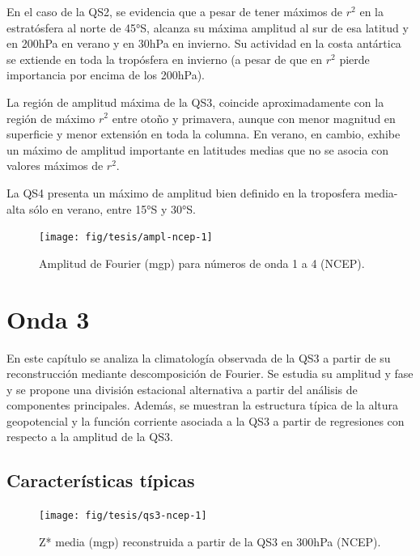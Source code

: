 \documentclass[spanish,a4paper,12pt,oneside]{book}
\begin{document}
En el caso de la QS2, se evidencia que a pesar de tener máximos de
\(r^2\) en la estratósfera al norte de 45°S, alcanza su máxima amplitud
al sur de esa latitud y en 200hPa en verano y en 30hPa en invierno. Su
actividad en la costa antártica se extiende en toda la tropósfera en
invierno (a pesar de que en \(r^2\) pierde importancia por encima de los
200hPa).

La región de amplitud máxima de la QS3, coincide aproximadamente con la
región de máximo \(r^2\) entre otoño y primavera, aunque con menor
magnitud en superficie y menor extensión en toda la columna. En verano,
en cambio, exhibe un máximo de amplitud importante en latitudes medias
que no se asocia con valores máximos de \(r^2\).

La QS4 presenta un máximo de amplitud bien definido en la troposfera
media-alta sólo en verano, entre 15°S y 30°S.

\begin{landscape}\begin{figure}

{\centering \texttt{[image: fig/tesis/ampl-ncep-1]} 

}

\caption{Amplitud de Fourier (mgp) para números de onda 1 a 4 (NCEP).}\label{fig:ampl-ncep}
\end{figure}
\end{landscape}

\hypertarget{onda-3}{%
\chapter{Onda 3}\label{onda-3}}

En este capítulo se analiza la climatología observada de la QS3 a partir
de su reconstrucción mediante descomposición de Fourier. Se estudia su
amplitud y fase y se propone una división estacional alternativa a
partir del análisis de componentes principales. Además, se muestran la
estructura típica de la altura geopotencial y la función corriente
asociada a la QS3 a partir de regresiones con respecto a la amplitud de
la QS3.

\hypertarget{caracteristicas-tipicas}{%
\section{Características típicas}\label{caracteristicas-tipicas}}

\begin{figure}
\texttt{[image: fig/tesis/qs3-ncep-1]} \caption{Z* media (mgp) reconstruida a partir de la QS3 en 300hPa (NCEP).}\label{fig:qs3-ncep}
\end{figure}
\end{document}
